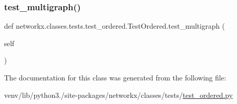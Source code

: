\subsubsection{\texorpdfstring{test\+\_\+multigraph()}{test\_multigraph()}}
{\footnotesize\ttfamily def networkx.\+classes.\+tests.\+test\+\_\+ordered.\+Test\+Ordered.\+test\+\_\+multigraph (\begin{DoxyParamCaption}\item[{}]{self }\end{DoxyParamCaption})}



The documentation for this class was generated from the following file\+:\begin{DoxyCompactItemize}
\item 
venv/lib/python3./site-\/packages/networkx/classes/tests/\hyperlink{test__ordered_8py}{test\+\_\+ordered.\+py}\end{DoxyCompactItemize}
